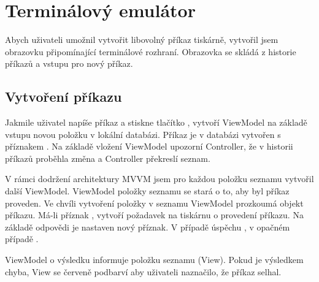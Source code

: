 \section{Terminálový emulátor}

Abych uživateli umožnil vytvořit libovolný příkaz tiskárně, vytvořil jsem obrazovku připomínající terminálové rozhraní.
Obrazovka se skládá z historie příkazů a vstupu pro nový příkaz.

\subsection{Vytvoření příkazu}

Jakmile uživatel napíše příkaz a stiskne tlačítko , vytvoří ViewModel na základě vstupu novou položku v lokální databázi.
Příkaz je v databázi vytvořen s příznakem .
Na základě vložení ViewModel upozorní Controller, že v historii příkazů proběhla změna a Controller překreslí seznam.

V rámci dodržení architektury MVVM jsem pro každou položku seznamu vytvořil další ViewModel.
ViewModel položky seznamu se stará o to, aby byl příkaz proveden.
Ve chvíli vytvoření položky v seznamu ViewModel prozkoumá objekt příkazu.
Má-li příznak , vytvoří požadavek na tiskárnu o provedení příkazu.
Na základě odpovědi je nastaven nový příznak.
V případě úspěchu , v opačném případě .

ViewModel o výsledku informuje položku seznamu (View).
Pokud je výsledkem chyba, View se červeně podbarví aby uživateli naznačilo, že příkaz selhal.
